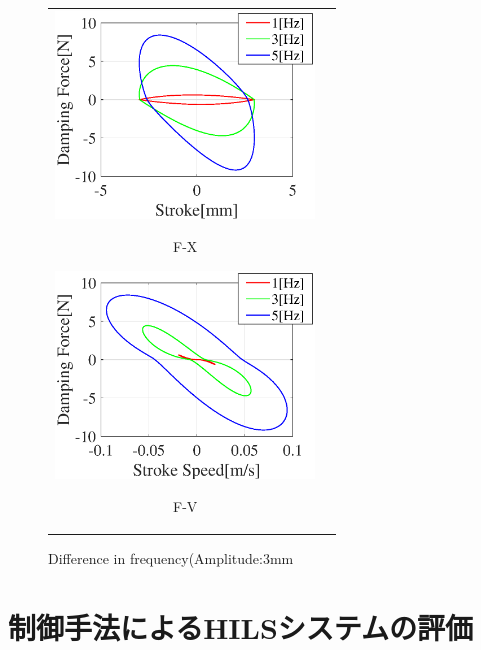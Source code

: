 \documentclass[a4paper,12pt]{article_vdlab_sotsuron}
\begin{document}
\vspace*{10mm}
\begin{figure}[h]
  \begin{tabular}{cc}
  \begin{minipage}{0.5\hsize}
  \begin{center}
    \includegraphics[height=55mm]{figure/damper_3_x_Fx.eps}
    \end{center}
    \begin{center}
    \ F-X\
    \end{center}
  \end{minipage}
  \begin{minipage}{0.5\hsize}
     \begin{center}
      \includegraphics[height=55mm]{figure/damper_3_x_Fv.eps}
      \end{center}
      \begin{center}
      \ F-V\
    \end{center}
  \end{minipage}
  \end{tabular}
  \vspace*{3mm}
  \caption{Difference in frequency(Amplitude:3mm}
    \label{fig:damper_3_x}
\end{figure}
\newpage

\section{制御手法によるHILSシステムの評価}
\end{document}
